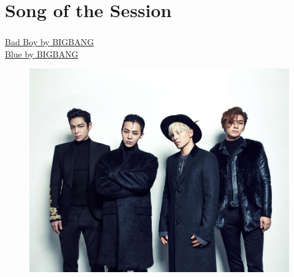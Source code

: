 \documentclass[xcolor=dvipsnames]{beamer}
\begin{document}
\section{Song of the Session}
\begin{frame}
\frametitle{\insertsectionhead}
\href{https://www.youtube.com/watch?v=1qnV55LUFVM}{Bad Boy by BIGBANG}\\
\href{https://www.youtube.com/watch?v=2GRP1rkE4O0}{Blue by BIGBANG}
\begin{figure}
\includegraphics[scale=0.25]{images/song.jpg}
\end{figure}
\end{frame}
\end{document}
